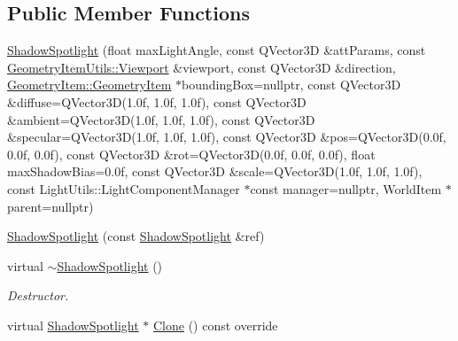 \subsection*{Public Member Functions}
\begin{DoxyCompactItemize}
\item 
\mbox{\hyperlink{class_geometry_engine_1_1_geometry_world_item_1_1_geometry_light_1_1_shadow_spotlight_a449038886cf15c295c8f7445f2eb5c95}{Shadow\+Spotlight}} (float max\+Light\+Angle, const Q\+Vector3D \&att\+Params, const \mbox{\hyperlink{class_geometry_engine_1_1_geometry_item_utils_1_1_viewport}{Geometry\+Item\+Utils\+::\+Viewport}} \&viewport, const Q\+Vector3D \&direction, \mbox{\hyperlink{class_geometry_engine_1_1_geometry_world_item_1_1_geometry_item_1_1_geometry_item}{Geometry\+Item\+::\+Geometry\+Item}} $\ast$bounding\+Box=nullptr, const Q\+Vector3D \&diffuse=Q\+Vector3D(1.\+0f, 1.\+0f, 1.\+0f), const Q\+Vector3\+D \&ambient=\+Q\+Vector3\+D(1.\+0f, 1.\+0f, 1.\+0f), const Q\+Vector3\+D \&specular=\+Q\+Vector3\+D(1.\+0f, 1.\+0f, 1.\+0f), const Q\+Vector3\+D \&pos=\+Q\+Vector3\+D(0.\+0f, 0.\+0f, 0.\+0f), const Q\+Vector3\+D \&rot=\+Q\+Vector3\+D(0.\+0f, 0.\+0f, 0.\+0f), float max\+Shadow\+Bias=0.\+0f, const Q\+Vector3\+D \&scale=\+Q\+Vector3\+D(1.\+0f, 1.\+0f, 1.\+0f), const Light\+Utils\+::\+Light\+Component\+Manager $\ast$const manager=nullptr, World\+Item $\ast$parent=nullptr)
\item 
\mbox{\hyperlink{class_geometry_engine_1_1_geometry_world_item_1_1_geometry_light_1_1_shadow_spotlight_a8757a401616b581827158f64eb176964}{Shadow\+Spotlight}} (const \mbox{\hyperlink{class_geometry_engine_1_1_geometry_world_item_1_1_geometry_light_1_1_shadow_spotlight}{Shadow\+Spotlight}} \&ref)
\item 
\mbox{\label{class_geometry_engine_1_1_geometry_world_item_1_1_geometry_light_1_1_shadow_spotlight_a1f4f0d06e4d09e72486844832122c01a}} 
virtual \mbox{\hyperlink{class_geometry_engine_1_1_geometry_world_item_1_1_geometry_light_1_1_shadow_spotlight_a1f4f0d06e4d09e72486844832122c01a}{$\sim$\+Shadow\+Spotlight}} ()
\begin{DoxyCompactList}\small\item\em Destructor. \end{DoxyCompactList}\item 
virtual \mbox{\hyperlink{class_geometry_engine_1_1_geometry_world_item_1_1_geometry_light_1_1_shadow_spotlight}{Shadow\+Spotlight}} $\ast$ \mbox{\hyperlink{class_geometry_engine_1_1_geometry_world_item_1_1_geometry_light_1_1_shadow_spotlight_a0ea8fd05d26f6e780d352168c28f940d}{Clone}} () const override
\end{DoxyCompactItemize}
